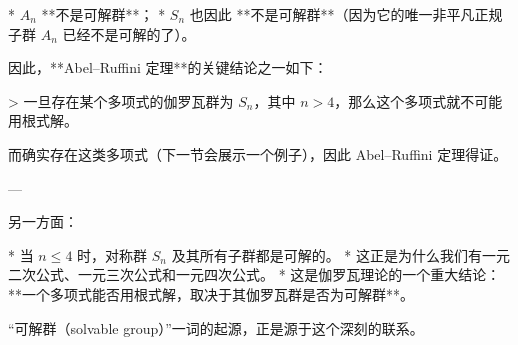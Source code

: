 * $A_n$ **不是可解群**；
* $S_n$ 也因此 **不是可解群**（因为它的唯一非平凡正规子群 $A_n$ 已经不是可解的了）。

因此，**Abel–Ruffini 定理**的关键结论之一如下：

> 一旦存在某个多项式的伽罗瓦群为 $S_n$，其中 $n > 4$，那么这个多项式就不可能用根式解。

而确实存在这类多项式（下一节会展示一个例子），因此 Abel–Ruffini 定理得证。

---

另一方面：

* 当 $n \leq 4$ 时，对称群 $S_n$ 及其所有子群都是可解的。
* 这正是为什么我们有一元二次公式、一元三次公式和一元四次公式。
* 这是伽罗瓦理论的一个重大结论：**一个多项式能否用根式解，取决于其伽罗瓦群是否为可解群**。

“可解群（solvable group）”一词的起源，正是源于这个深刻的联系。
